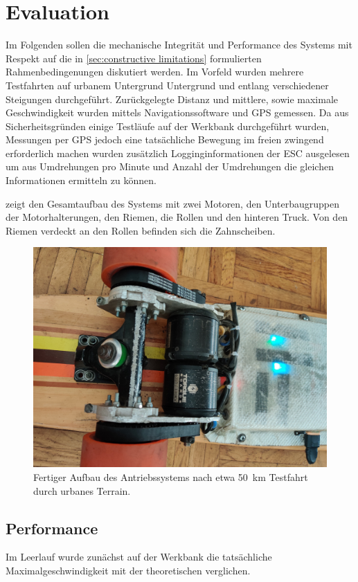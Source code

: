 \chapter{Evaluation}
	Im Folgenden sollen die mechanische Integrität und Performance des Systems mit Respekt auf die in \cref{sec:constructive limitations} formulierten Rahmenbedingenungen diskutiert werden.
	Im Vorfeld wurden mehrere Testfahrten auf urbanem Untergrund Untergrund und entlang verschiedener Steigungen durchgeführt.
	Zurückgelegte Distanz und mittlere, sowie maximale Geschwindigkeit wurden mittels Navigationssoftware und GPS gemessen.
	Da aus Sicherheitsgründen einige Testläufe auf der Werkbank durchgeführt wurden, Messungen per GPS jedoch eine tatsächliche Bewegung im freien zwingend erforderlich machen wurden zusätzlich Logginginformationen der ESC ausgelesen um aus Umdrehungen pro Minute und Anzahl der Umdrehungen die gleichen Informationen ermitteln zu können.\par\medskip
	 zeigt den Gesamtaufbau des Systems mit zwei Motoren, den Unterbaugruppen der Motorhalterungen, den Riemen, die Rollen und den hinteren Truck.
	Von den Riemen verdeckt an den Rollen befinden sich die Zahnscheiben.
	\begin{figure}[h]
		\centering
		\includegraphics[angle=180, width=.8\textwidth]{Footage/Pictures/Drivetrain close up v2.jpg}
		\caption[Fertiger Aufbau des Antriebssystems]{Fertiger Aufbau des Antriebssystems nach etwa \qty{50}{\kilo\metre} Testfahrt durch urbanes Terrain.}
		\label{fig:real world assembly}
	\end{figure}

	\section{Performance}
		Im Leerlauf wurde zunächst auf der Werkbank die tatsächliche Maximalgeschwindigkeit mit der theoretischen verglichen.

